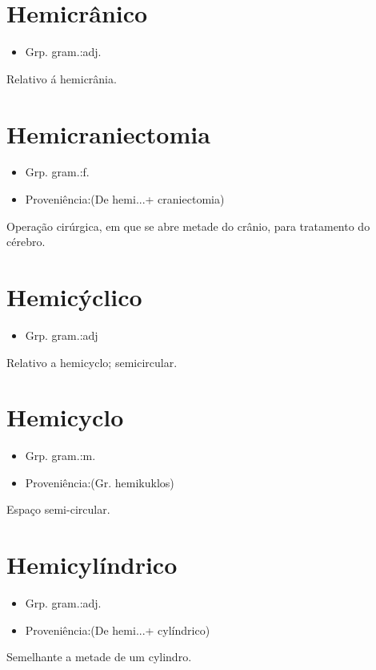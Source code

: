 \documentclass{article}
\begin{document}
\section{Hemicrânico}
\begin{itemize}
\item {Grp. gram.:adj.}
\end{itemize}
Relativo á hemicrânia.
\section{Hemicraniectomia}
\begin{itemize}
\item {Grp. gram.:f.}
\end{itemize}
\begin{itemize}
\item {Proveniência:(De \textunderscore hemi...\textunderscore  + \textunderscore craniectomia\textunderscore )}
\end{itemize}
Operação cirúrgica, em que se abre metade do crânio, para tratamento do cérebro.
\section{Hemicýclico}
\begin{itemize}
\item {Grp. gram.:adj}
\end{itemize}
Relativo a hemicyclo; semicircular.
\section{Hemicyclo}
\begin{itemize}
\item {Grp. gram.:m.}
\end{itemize}
\begin{itemize}
\item {Proveniência:(Gr. \textunderscore hemikuklos\textunderscore )}
\end{itemize}
Espaço semi-circular.
\section{Hemicylíndrico}
\begin{itemize}
\item {Grp. gram.:adj.}
\end{itemize}
\begin{itemize}
\item {Proveniência:(De \textunderscore hemi...\textunderscore  + \textunderscore cylíndrico\textunderscore )}
\end{itemize}
Semelhante a metade de um cylindro.
\end{document}
